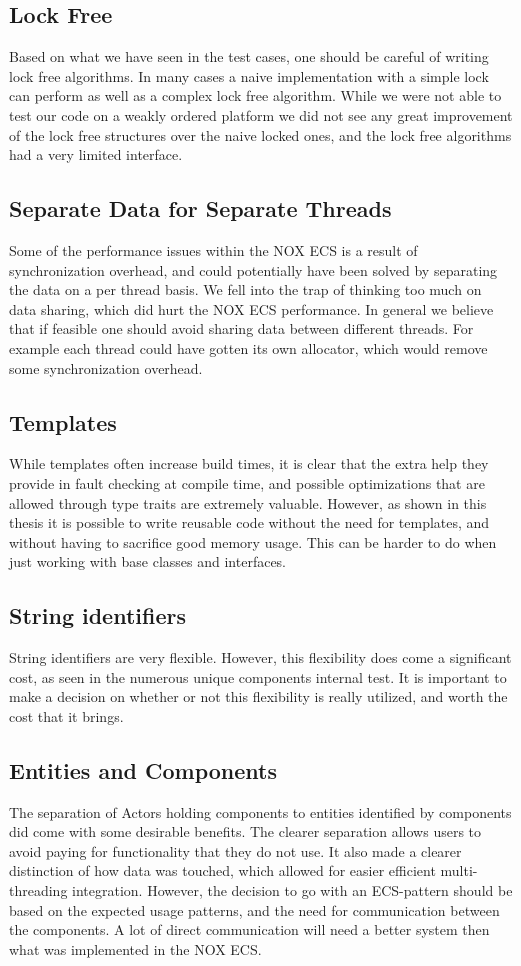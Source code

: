 \subsection{Lock Free}
Based on what we have seen in the test cases, one should be careful of writing lock free algorithms.
In many cases a naive implementation with a simple lock can perform as well as a complex lock free algorithm.
While we were not able to test our code on a weakly ordered platform we did not see any great improvement
of the lock free structures over the naive locked ones, and the lock free algorithms had a very limited interface.

\subsection{Separate Data for Separate Threads}
Some of the performance issues within the NOX ECS is a result of synchronization overhead,
and could potentially have been solved by separating the data on a per thread basis.
We fell into the trap of thinking too much on data sharing, which did hurt the NOX ECS performance.
In general we believe that if feasible one should avoid sharing data between different threads.
For example each thread could have gotten its own allocator, which would remove some synchronization overhead.

\subsection{Templates}
While templates often increase build times, it is clear that the extra help they provide in
fault checking at compile time, and possible optimizations that are allowed through type traits
are extremely valuable.
However, as shown in this thesis it is possible to write reusable code without the need for templates,
and without having to sacrifice good memory usage. This can be harder to do when just working with
base classes and interfaces.

\subsection{String identifiers}
String identifiers are very flexible. However, this flexibility does come a significant cost, as seen
in the numerous unique components internal test.
It is important to make a decision on whether or not this flexibility is really utilized, and worth
the cost that it brings.

\subsection{Entities and Components}
The separation of Actors holding components to entities identified by components did come with some
desirable benefits. The clearer separation allows users to avoid paying for functionality that they
do not use. It also made a clearer distinction of how data was touched, which allowed for easier efficient
multi-threading integration.
However, the decision to go with an ECS-pattern should be based on the expected usage patterns, and the
need for communication between the components.
A lot of direct communication will need a better system then what was implemented in the NOX ECS.

